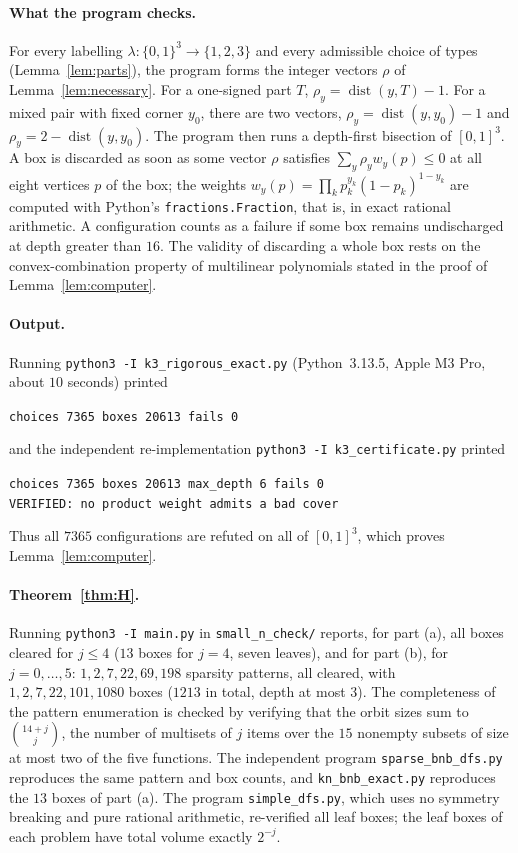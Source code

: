 \documentclass[11pt,letterpaper]{article}
\theoremstyle{definition}
\DeclareMathOperator{\dist}{dist}
\begin{document}
\paragraph{What the program checks.}
For every labelling $\lambda\colon\{0,1\}^3\to\{1,2,3\}$ and every admissible choice of types
(Lemma~\ref{lem:parts}), the program forms the integer vectors $\rho$ of
Lemma~\ref{lem:necessary}. For a one-signed part $T$, $\rho_y=\dist(y,T)-1$. For a mixed pair with
fixed corner $y_0$, there are two vectors, $\rho_y=\dist(y,y_0)-1$ and $\rho_y=2-\dist(y,y_0)$. The
program then runs a depth-first bisection of $[0,1]^3$. A box is discarded as soon as some vector
$\rho$ satisfies $\sum_y\rho_yw_y(p)\le0$ at all eight vertices $p$ of the box; the weights
$w_y(p)=\prod_kp_k^{y_k}(1-p_k)^{1-y_k}$ are computed with Python's \texttt{fractions.Fraction},
that is, in exact rational arithmetic. A configuration counts as a failure if some box remains
undischarged at depth greater than $16$. The validity of discarding a whole box rests on the
convex-combination property of multilinear polynomials stated in the proof of
Lemma~\ref{lem:computer}.

\paragraph{Output.}
Running \texttt{python3 -I k3\_rigorous\_exact.py} (Python~3.13.5, Apple M3 Pro, about $10$ seconds)
printed
\begin{center}
\texttt{choices 7365 boxes 20613 fails 0}
\end{center}
and the independent re-implementation \texttt{python3 -I k3\_certificate.py} printed
\begin{center}
\texttt{choices 7365 boxes 20613 max\_depth 6 fails 0}\\
\texttt{VERIFIED: no product weight admits a bad cover}
\end{center}
Thus all $7365$ configurations are refuted on all of $[0,1]^3$, which proves
Lemma~\ref{lem:computer}.

\paragraph{Theorem~\ref{thm:H}.}
Running \texttt{python3 -I main.py} in \texttt{small\_n\_check/} reports, for part (a), all boxes
cleared for $j\le4$ ($13$ boxes for $j=4$, seven leaves), and for part (b), for $j=0,\dots,5$:
$1,2,7,22,69,198$ sparsity patterns, all cleared, with $1,2,7,22,101,1080$ boxes ($1213$ in total,
depth at most $3$). The completeness of the pattern enumeration is checked by verifying that the
orbit sizes sum to $\binom{14+j}{j}$, the number of multisets of $j$ items over the $15$ nonempty
subsets of size at most two of the five functions. The independent program
\texttt{sparse\_bnb\_dfs.py} reproduces the same pattern and box counts, and
\texttt{kn\_bnb\_exact.py} reproduces the $13$ boxes of part (a). The program \texttt{simple\_dfs.py},
which uses no symmetry breaking and pure rational arithmetic, re-verified all leaf boxes; the leaf
boxes of each problem have total volume exactly $2^{-j}$.
\end{document}
